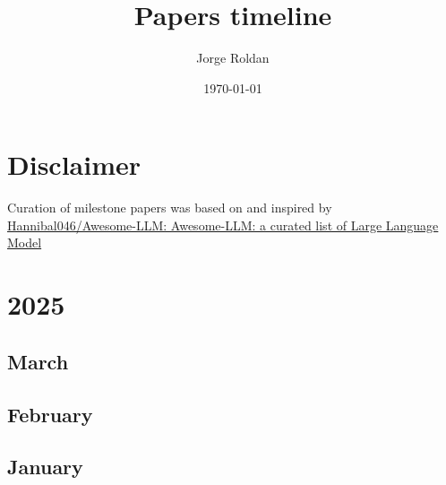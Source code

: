 \documentclass[12pt]{article}
\begin{document}
\title{\Large Papers timeline}
\author{Jorge Roldan}
\date{\today}

\maketitle

\tableofcontents

\newpage
\section{Disclaimer}
Curation of milestone papers was based on and inspired by \href{https://github.com/Hannibal046/Awesome-LLM}
{Hannibal046/Awesome-LLM: Awesome-LLM: a curated list of Large Language Model}

\newpage
\section{2025}

\subsection{March}

\subsection{February}
\begin{refsection}
    \nocite{}
    \printbibliography[heading=none]
\end{refsection}


\subsection{January}
\begin{refsection}
    \nocite{deepseek-ai_deepseek-r1_2025}
    \printbibliography[heading=none]
\end{refsection}
\end{document}
